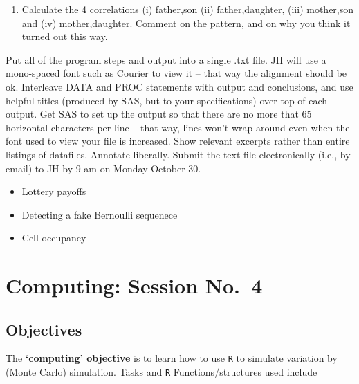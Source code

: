 \documentclass[]{book}
\begin{document}
\begin{enumerate}
\item
  Calculate the 4 correlations (i) father,son (ii) father,daughter, (iii) mother,son and (iv) mother,daughter. Comment on the pattern, and on why you think it turned out this way.
\end{enumerate}

Put all of the program steps and output into a single .txt file. JH will use a mono-spaced font such as Courier to view it -- that way the alignment should be ok. Interleave DATA and PROC statements with output and conclusions, and use helpful titles (produced by SAS, but to your specifications) over top of each output. Get SAS to set up the output so that there are no more that 65 horizontal characters per line -- that way, lines won't wrap-around even when the font used to view your file is increased. Show relevant excerpts rather than entire listings of datafiles. Annotate liberally. Submit the text file electronically (i.e., by email) to JH by 9 am on Monday October 30.

\begin{itemize}
\item
  Lottery payoffs
\item
  Detecting a fake Bernoulli sequenece
\item
  Cell occupancy
\end{itemize}

\hypertarget{computing04}{%
\chapter{Computing: Session No.~4}\label{computing04}}

\hypertarget{objectives-6}{%
\section{Objectives}\label{objectives-6}}

The \textbf{`computing' objective} is to learn how to use \texttt{R} to simulate variation by (Monte Carlo) simulation. Tasks and \texttt{R} Functions/structures used include
\end{document}
